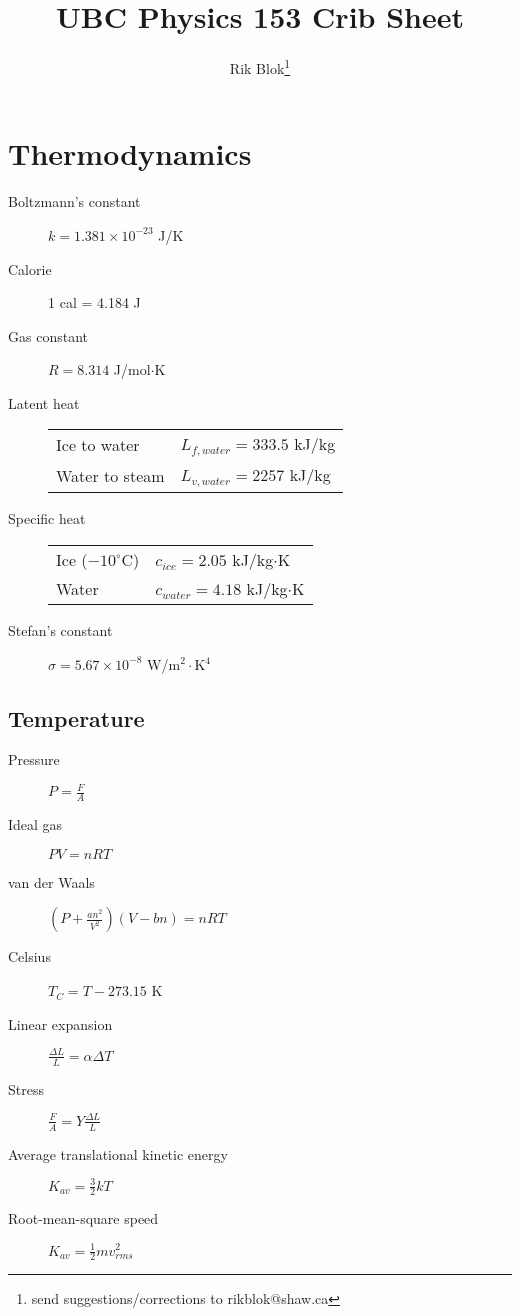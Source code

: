\documentclass{article}
\title{\large UBC Physics 153 Crib Sheet}
\author{Rik Blok\thanks{send suggestions/corrections to rikblok@shaw.ca}}
\newcommand{\bd}{\begin{description}}
\newcommand{\ed}{\end{description}}
\newcommand{\e}[1]{\times 10^{#1}}
\newcommand{\half}{\frac{1}{2}}
\begin{document}
\small



\section{Thermodynamics}
\bd
	\item[Boltzmann's constant] $ k = 1.381 \e{-23} $ J/K
	\item[Calorie] 1 cal = 4.184 J
	\item[Gas constant] $ R = 8.314 $ J/mol$\cdot$K
	\item[Latent heat]
		\begin{tabular}{ll}
			Ice to water & $ L_{f,water} = 333.5 $ kJ/kg \\
			Water to steam & $ L_{v,water} = 2257 $ kJ/kg
		\end{tabular}
	\item[Specific heat]
		\begin{tabular}{ll}
			Ice ($-10 ^\circ$C) & $ c_{ice} = 2.05 $ kJ/kg$\cdot$K \\
			Water & $ c_{water} = 4.18 $ kJ/kg$\cdot$K
		\end{tabular}
	\item[Stefan's constant] $ \sigma = 5.67 \e{-8} $ W/m$^2\cdot$K$^4$
\ed

\subsection{Temperature}
\bd
	\item[Pressure] $ P = \frac{F}{A} $
	\item[Ideal gas] $ PV = nRT $
	\item[van der Waals] $\left(P + \frac{an^2}{V^2}\right) \left(V - bn\right) = nRT $
	\item[Celsius] $T_C = T - 273.15 $ K
	\item[Linear expansion] $ \frac{\Delta L}{L} = \alpha \Delta T $
	\item[Stress] $ \frac{F}{A} = Y \frac{\Delta L}{L} $
	\item[Average translational kinetic energy] $ K_{av} = \frac{3}{2} kT $
	\item[Root-mean-square speed] $ K_{av} = \half mv_{rms}^2 $
\ed
\end{document}
